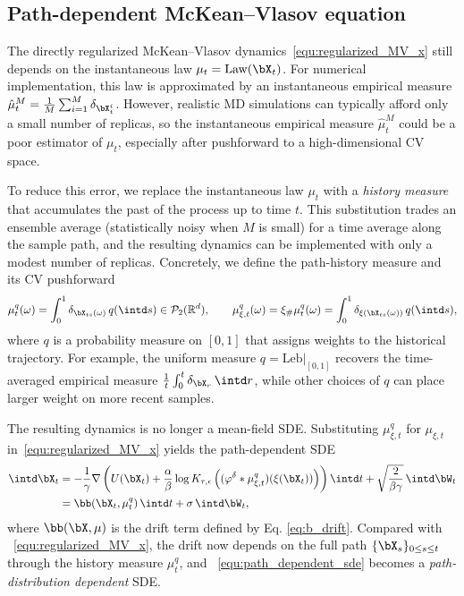 \documentclass[a4paper,fleqn]{cas-sc}
\theoremstyle{definition}
\begin{document}
\subsection{Path-dependent McKean--Vlasov equation}
\label{subsec:path}



The directly regularized McKean--Vlasov dynamics~\eqref{equ:regularized_MV_x} still depends on the instantaneous law 
\(\mu_t={\rm Law}(\bX_t)\). 
For numerical implementation, this law is approximated by an instantaneous empirical measure $\hat{\mu}_t^M = \frac{1}{M}\sum_{i=1}^M \delta_{\bX_t^i}$. 
However, realistic MD simulations can typically afford only a small number of replicas, so the instantaneous empirical measure $\hat{\mu}_t^M$ could be a poor estimator of $\mu_t$, especially after pushforward to a high-dimensional CV space.


To reduce this error, we replace the instantaneous law $\mu_t$ with a \emph{history measure} that accumulates the past of the process up to time $t$. This substitution trades an ensemble average (statistically noisy when $M$ is small) for a time average along the sample path, and the resulting dynamics can be implemented with only a modest number of replicas. Concretely, we define the path-history measure and its CV pushforward
\begin{equation}
\mu_t^q(\omega) = \int_0^1 \delta_{\bX_{ts}(\omega)}\, q(\intd s) \in \mathcal P_2(\mathbb R^{d}), \qquad \mu_{\xi,t}^q(\omega) = \xi_\#\mu_t^q(\omega) =\int_0^1 \delta_{\xi(\bX_{ts}(\omega))}\, q(\intd s), 
\label{eq:mu_q_path}
\end{equation}
where $q$ is a probability measure on $[0,1]$ that assigns weights to the historical trajectory.
For example, the uniform measure $q = \mathrm{Leb}|_{[0,1]}$ recovers the time-averaged empirical measure $\frac{1}{t}\int_0^t \delta_{\bX_r}\,\intd r$, while other choices of $q$ can place larger weight on more recent samples. 

The resulting dynamics is no longer a mean-field SDE. Substituting $\mu_{\xi,t}^q$ for $\mu_{\xi,t}$ in~\eqref{equ:regularized_MV_x} yields the path-dependent SDE
\begin{equation}\label{equ:path_dependent_sde}
\begin{aligned}
    \intd \bX_t &= -\frac{1}{\gamma}\nabla  \left( U(\bX_t) + \frac{\alpha}{\beta} \log K_{\tau,\epsilon} \left( (\varphi^\delta*\mu^q_{\xi,t} )(\xi(\bX_t))\right) \right) \intd t + \sqrt{\frac{2}{\beta\gamma}}\,\intd \bW_t\\
    &= \bb(\bX_t,\mu_t^q)\, \intd t +\sigma\, \intd \bW_t,
\end{aligned}
\end{equation}
where $\bb(\bX, \mu)$ is the drift term defined by Eq. \eqref{eq:b_drift}. Compared with ~\eqref{equ:regularized_MV_x}, the drift now depends on the full path $\{\bX_s\}_{0 \le s \le t}$ through the history measure $\mu_t^q$, and ~\eqref{equ:path_dependent_sde} becomes a \emph{path-distribution dependent} SDE. 
\end{document}
